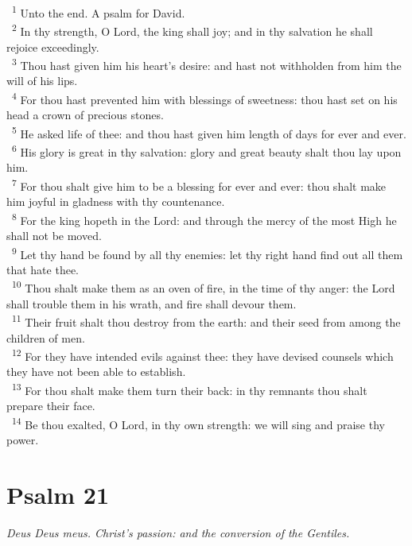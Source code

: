 \documentclass[a5paper,12pt]{article}
\begin{document}
\begin{multicols*}{2}
~\textsuperscript{1} Unto the end. A psalm for David.\\
~\textsuperscript{2} In thy strength, O Lord, the king shall joy; and in thy salvation he shall rejoice exceedingly.\\
~\textsuperscript{3} Thou hast given him his heart's desire: and hast not withholden from him the will of his lips.\\
~\textsuperscript{4} For thou hast prevented him with blessings of sweetness: thou hast set on his head a crown of precious stones.\\
~\textsuperscript{5} He asked life of thee: and thou hast given him length of days for ever and ever.\\
~\textsuperscript{6} His glory is great in thy salvation: glory and great beauty shalt thou lay upon him.\\
~\textsuperscript{7} For thou shalt give him to be a blessing for ever and ever: thou shalt make him joyful in gladness with thy countenance.\\
~\textsuperscript{8} For the king hopeth in the Lord: and through the mercy of the most High he shall not be moved.\\
~\textsuperscript{9} Let thy hand be found by all thy enemies: let thy right hand find out all them that hate thee.\\
~\textsuperscript{10} Thou shalt make them as an oven of fire, in the time of thy anger: the Lord shall trouble them in his wrath, and fire shall devour them.\\
~\textsuperscript{11} Their fruit shalt thou destroy from the earth: and their seed from among the children of men.\\
~\textsuperscript{12} For they have intended evils against thee: they have devised counsels which they have not been able to establish.\\
~\textsuperscript{13} For thou shalt make them turn their back: in thy remnants thou shalt prepare their face.\\
~\textsuperscript{14} Be thou exalted, O Lord, in thy own strength: we will sing and praise thy power.\\

\section{Psalm 21}
\label{sec:orgdfb433c}
\emph{Deus Deus meus. Christ's passion: and the conversion of the Gentiles.}\\


\end{multicols*}
\end{document}
